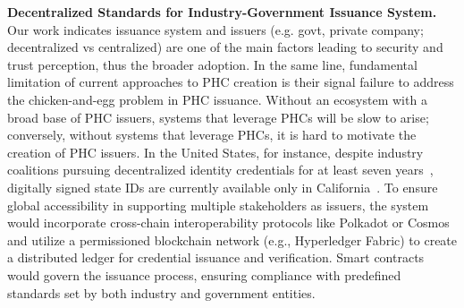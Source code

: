 \textbf{Decentralized Standards for Industry-Government Issuance System.}
 Our work indicates issuance system and issuers (e.g. govt, private company; decentralized vs centralized) are one of the main factors leading to security and trust perception, thus the broader adoption. In the same line, fundamental limitation of current approaches to PHC creation is their signal failure to address the chicken-and-egg problem in PHC issuance. Without an ecosystem with a broad base of PHC issuers, systems that leverage PHCs will be slow to arise; conversely, without systems that leverage PHCs, it is hard to motivate the creation of PHC issuers. In the United States, for instance, despite industry coalitions pursuing decentralized identity credentials for at least seven years~\cite{mediumDecentralizedIdentity}, digitally signed state IDs are currently available only in California~\cite{caWalletPilot}. 
 To ensure global accessibility in supporting multiple stakeholders as issuers, the system would incorporate cross-chain interoperability protocols like Polkadot or Cosmos and utilize a permissioned blockchain network (e.g., Hyperledger Fabric) to create a distributed ledger for credential issuance and verification. Smart contracts~\cite{sharma2023mixed} would govern the issuance process, ensuring compliance with predefined standards set by both industry and government entities. 
